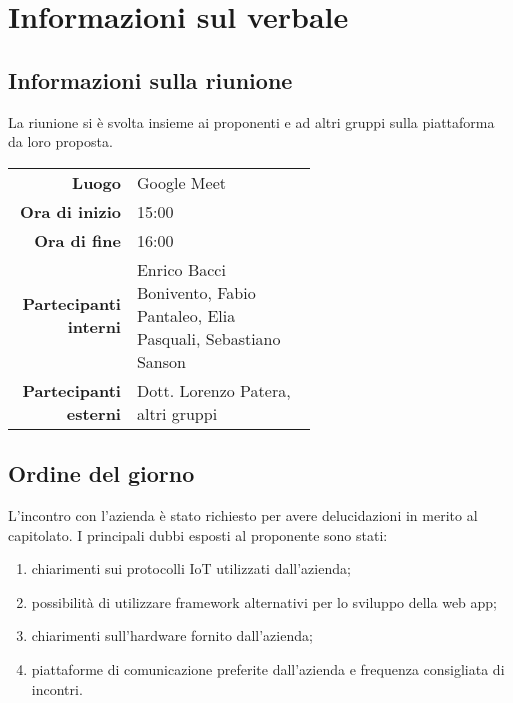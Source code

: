 \section{Informazioni sul verbale}

\subsection{Informazioni sulla riunione}
La riunione si è svolta insieme ai proponenti e ad altri gruppi sulla piattaforma da loro proposta.

\begin{center}
	\begin{tabular}{r|p{0.6\linewidth}}
		\toprule
		\textbf{Luogo} & Google Meet \\
		\textbf{Ora di inizio} & 15:00 \\
		\textbf{Ora di fine} & 16:00 \\
		\textbf{Partecipanti interni} & Enrico Bacci Bonivento, Fabio Pantaleo, Elia Pasquali, Sebastiano Sanson \\
		\textbf{Partecipanti esterni} & Dott. Lorenzo Patera, altri gruppi
	\end{tabular}
\end{center}

\medskip

\subsection{Ordine del giorno}
L'incontro con l'azienda è stato richiesto per avere delucidazioni in merito al capitolato. I principali dubbi esposti al proponente sono stati:
\begin{enumerate}
	\item chiarimenti sui protocolli IoT utilizzati dall'azienda;
	\item possibilità di utilizzare framework alternativi per lo sviluppo della web app;
	\item chiarimenti sull'hardware fornito dall'azienda;
	\item piattaforme di comunicazione preferite dall'azienda e frequenza consigliata di incontri.
\end{enumerate}
